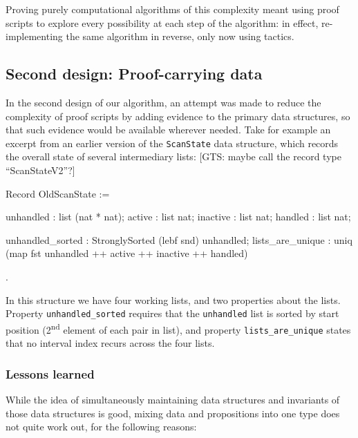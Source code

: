 \documentclass{llncs}
\newif\ifdraft\drafttrue  %
\newcommand{\xcomment}[3]{\ifdraft\textcolor{#1}{[#2: #3]}\else\fi}
\newcommand{\gts}[1]{\xcomment{OliveGreen}{GTS}{#1}}
\begin{document}
Proving purely computational algorithms of this complexity meant using proof
scripts to explore every possibility at each step of the algorithm: in effect,
re-implementing the same algorithm in reverse, only now using tactics.

\subsection{Second design: Proof-carrying data}
\label{sec:depinduct}

In the second design of our algorithm, an attempt was made to reduce the
complexity of proof scripts by adding evidence to the primary data structures,
so that such evidence would be available wherever needed.  Take for example an
excerpt from an earlier version of the \texttt{ScanState} data structure,
which records the overall state of several intermediary lists:
\gts{maybe call the record type ``ScanStateV2''?}

\begin{MyCoqExampleStar}
Record OldScanState := {
    unhandled : list (nat * nat);
    active    : list nat;
    inactive  : list nat;
    handled   : list nat;

    unhandled_sorted : StronglySorted (lebf snd) unhandled;
    lists_are_unique : uniq (map fst unhandled ++ active ++
                             inactive ++ handled)
}.
\end{MyCoqExampleStar}

In this structure we have four working lists, and two properties about
the lists. Property \texttt{unhandled\_sorted} requires that the
\texttt{unhandled} list is sorted by start position
(2\textsuperscript{nd} element of each pair in list), and property
\texttt{lists\_are\_unique} states that no interval index recurs
across the four lists.

\subsubsection*{Lessons learned}

While the idea of simultaneously maintaining data structures and
invariants of those data structures is good, mixing data and
propositions into one type does not quite work out, for the following
reasons: 
\end{document}
